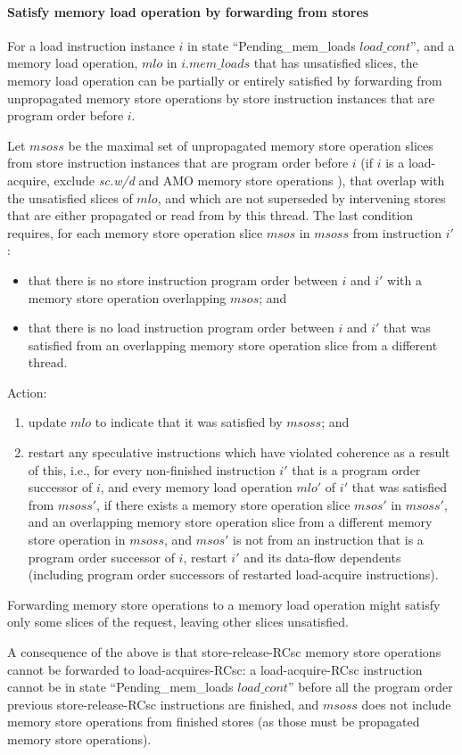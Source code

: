 \paragraph{Satisfy memory load operation by forwarding from stores}\label{omm:thread:sat_by_forwarding}
For a load instruction instance $i$ in state ``{\sc Pending\_mem\_loads} $load\_cont$'', and a memory load operation, $mlo$ in $i.mem\_loads$ that has unsatisfied slices, the memory load operation can be partially or entirely satisfied by forwarding from unpropagated memory store operations by store instruction instances that are program order before $i$.

Let $msoss$ be the maximal set of unpropagated memory store operation slices from store instruction instances that are program order before $i$ (if $i$ is a load-acquire, exclude {\em sc.w/d} and AMO memory store operations ), that overlap with the unsatisfied slices of $mlo$, and which are not superseded by intervening stores that are either propagated or read from by this thread.
The last condition requires, for each memory store operation slice $msos$ in $msoss$ from instruction $i'$:
\begin{itemize}
\item that there is no store instruction program order between $i$ and $i'$ with a memory store operation overlapping $msos$; and
\item that there is no load instruction program order between $i$ and $i'$ that was satisfied from an overlapping memory store operation slice from a different thread.
\end{itemize}
Action:
\begin{enumerate}
\item update $mlo$ to indicate that it was satisfied by $msoss$; and
\item restart any speculative instructions which have violated coherence as a result of this, i.e., for every non-finished instruction $i'$ that is a program order successor of $i$, and every memory load operation $mlo'$ of $i'$ that was satisfied from $msoss'$, if there exists a memory store operation slice $msos'$ in $msoss'$, and an overlapping memory store operation slice from a different memory store operation in $msoss$, and $msos'$ is not from an instruction that is a program order successor of $i$, restart $i'$ and its data-flow dependents (including program order successors of restarted load-acquire instructions).
\end{enumerate}

\begin{commentary}
Forwarding memory store operations to a memory load operation might satisfy only some slices of the request, leaving other slices unsatisfied.

A consequence of the above is that store-release-RCsc memory store operations cannot be forwarded to load-acquires-RCsc:
a load-acquire-RCsc instruction cannot be in state ``{\sc Pending\_mem\_loads} $load\_cont$'' before all the program order previous store-release-RCsc instructions are finished, and $msoss$ does not include memory store operations from finished stores (as those must be propagated memory store operations).
\end{commentary}


